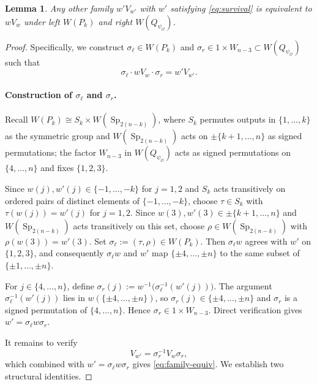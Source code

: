 \documentclass[11pt,notitlepage]{amsart}
\newtheorem{lemma}[theorem]{Lemma}
\theoremstyle{definition}
\theoremstyle{remark}
\newcommand{\calO}{\mathcal{O}}
\DeclareMathOperator{\Sp}{Sp}
\begin{document}
\begin{lemma}
Any other family $w' V_{w'}$ with $w'$ satisfying \eqref{eq:survival} is equivalent to $w V_w$ under left $W(P_k)$ and right $W(Q_{\psi_\calO})$.
\end{lemma}
\begin{proof}
Specifically, we construct $\sigma_\ell \in W(P_k)$ and $\sigma_r \in 1 \times W_{n-3} \subset W(Q_{\psi_\calO})$ such that
\begin{equation}\label{eq:family-equiv}
    \sigma_\ell \cdot w V_w \cdot \sigma_r = w' V_{w'}.
\end{equation}

\paragraph{Construction of $\sigma_\ell$ and $\sigma_r$.} Recall $W(P_k) \cong S_k \times W(\Sp_{2(n-k)})$, where $S_k$ permutes outputs in $\{1, \ldots, k\}$ as the symmetric group and $W(\Sp_{2(n-k)})$ acts on $\pm\{k+1, \ldots, n\}$ as signed permutations; the factor $W_{n-3}$ in $W(Q_{\psi_\calO})$ acts as signed permutations on $\{4, \ldots, n\}$ and fixes $\{1, 2, 3\}$.

Since $w(j), w'(j) \in \{-1, \ldots, -k\}$ for $j = 1, 2$ and $S_k$ acts transitively on ordered pairs of distinct elements of $\{-1, \ldots, -k\}$, choose $\tau \in S_k$ with $\tau(w(j)) = w'(j)$ for $j = 1, 2$. Since $w(3), w'(3) \in \pm\{k+1, \ldots, n\}$ and $W(\Sp_{2(n-k)})$ acts transitively on this set, choose $\rho \in W(\Sp_{2(n-k)})$ with $\rho(w(3)) = w'(3)$. Set $\sigma_\ell := (\tau, \rho) \in W(P_k)$. Then $\sigma_\ell w$ agrees with $w'$ on $\{1, 2, 3\}$, and consequently $\sigma_\ell w$ and $w'$ map $\{\pm 4, \ldots, \pm n\}$ to the same subset of $\{\pm 1, \ldots, \pm n\}$.

For $j \in \{4, \ldots, n\}$, define
    $\sigma_r(j) := w^{-1}\bigl(\sigma_\ell^{-1}(w'(j))\bigr)$. The argument $\sigma_\ell^{-1}(w'(j))$ lies in $w(\{\pm 4, \ldots, \pm n\})$, so $\sigma_r(j) \in \{\pm 4, \ldots, \pm n\}$ and $\sigma_r$ is a signed permutation of $\{4, \ldots, n\}$. Hence $\sigma_r \in 1 \times W_{n-3}$. Direct verification gives $w' = \sigma_\ell w \sigma_r$.

It remains to verify
\begin{equation}\label{eq:V-compat}
    V_{w'} = \sigma_r^{-1} V_w \sigma_r,
\end{equation}
which combined with $w' = \sigma_\ell w \sigma_r$ gives \eqref{eq:family-equiv}. We establish two structural identities.


\end{proof}
\end{document}
